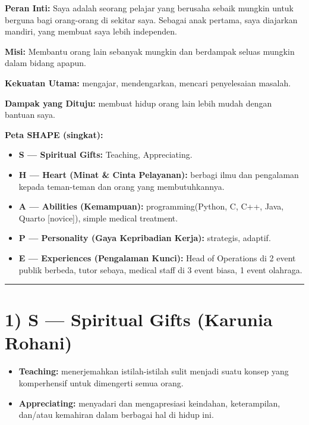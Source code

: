 \documentclass[
  letterpaper,
  DIV=11,
  numbers=noendperiod]{scrreprt}
\providecommand{\tightlist}{%
  \setlength{\itemsep}{0pt}\setlength{\parskip}{0pt}}\usepackage{longtable,booktabs,array}
\begin{document}
\textbf{Peran Inti:} Saya adalah seorang pelajar yang berusaha sebaik
mungkin untuk berguna bagi orang-orang di sekitar saya. Sebagai anak
pertama, saya diajarkan mandiri, yang membuat saya lebih independen.

\textbf{Misi:} Membantu orang lain sebanyak mungkin dan berdampak seluas
mungkin dalam bidang apapun.

\textbf{Kekuatan Utama:} mengajar, mendengarkan, mencari penyelesaian
masalah.

\textbf{Dampak yang Dituju:} membuat hidup orang lain lebih mudah dengan
bantuan saya.

\textbf{Peta SHAPE (singkat):}

\begin{itemize}
\tightlist
\item
  \textbf{S --- Spiritual Gifts:} Teaching, Appreciating.
\item
  \textbf{H --- Heart (Minat \& Cinta Pelayanan):} berbagi ilmu dan
  pengalaman kepada teman-teman dan orang yang membutuhkannya.
\item
  \textbf{A --- Abilities (Kemampuan):} programming(Python, C, C++,
  Java, Quarto {[}novice{]}), simple medical treatment.
\item
  \textbf{P --- Personality (Gaya Kepribadian Kerja):} strategis,
  adaptif.
\item
  \textbf{E --- Experiences (Pengalaman Kunci):} Head of Operations di 2
  event publik berbeda, tutor sebaya, medical staff di 3 event biasa, 1
  event olahraga.
\end{itemize}

\begin{center}\rule{0.5\linewidth}{0.5pt}\end{center}

\section{1) S --- Spiritual Gifts (Karunia
Rohani)}\label{s-spiritual-gifts-karunia-rohani}

\begin{itemize}
\item
  \textbf{Teaching:} menerjemahkan istilah-istilah sulit menjadi suatu
  konsep yang komperhensif untuk dimengerti semua orang.
\item
  \textbf{Appreciating:} menyadari dan mengapresiasi keindahan,
  keterampilan, dan/atau kemahiran dalam berbagai hal di hidup ini.
\end{itemize}
\end{document}
